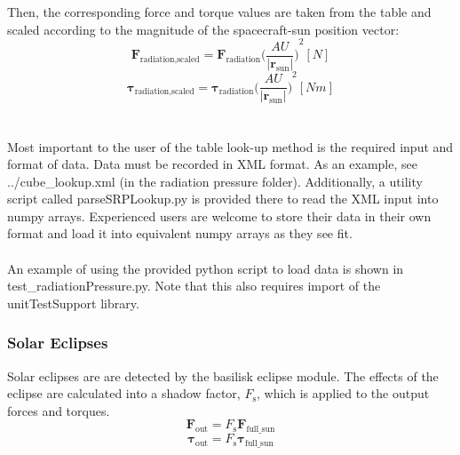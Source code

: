 Then, the corresponding force and torque values are taken from the table and scaled according to the magnitude of the spacecraft-sun position vector:
\begin{equation}
{\mathbf{F}_{\textrm{radiation,scaled}}} = {\mathbf{F}_{\textrm{radiation}}}{\Big(  \frac{AU}{|\textbf{r}_{\textrm{sun}}|}  \Big)}^{2} [N]
\end{equation}
\begin{equation}
{\mathbf{\tau}_{\textrm{radiation,scaled}}} = {\mathbf{\tau}_{\textrm{radiation}}}{\Big(  \frac{AU}{|\textbf{r}_{\textrm{sun}}|}  \Big)}^{2} [Nm]
\end{equation}\\\\
Most important to the user of the table look-up method is the required input and format of data. Data must be recorded in XML format. As an example, see ../cube\_lookup.xml (in the radiation pressure folder). Additionally, a utility script called parseSRPLookup.py is provided there to read the XML input into numpy arrays. Experienced users are welcome to store their data in their own format and load it into equivalent numpy arrays as they see fit.\\\\
An example of using the provided python script to load data is shown in test\_radiationPressure.py. Note that this also requires import of the unitTestSupport library.\\
\subsubsection{Solar Eclipses}
Solar eclipses are are detected by the basilisk eclipse module. The effects of the eclipse are calculated into a shadow factor, $F_{\mathrm{s}}$, which is applied to the output forces and torques. 
\begin{equation}
\mathbf{F}_{\mathrm{out}} = F_{\mathrm{s}}\mathbf{F}_{\mathrm{full\_sun}}
\end{equation}
\begin{equation}
\bm{\tau}_{\mathrm{out}} = F_{\mathrm{s}}\bm{\tau}_{\mathrm{full\_sun}}
\end{equation}
